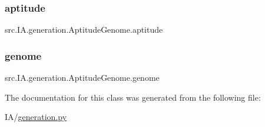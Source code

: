 \subsubsection{\texorpdfstring{aptitude}{aptitude}}
{\footnotesize\ttfamily src.\+I\+A.\+generation.\+Aptitude\+Genome.\+aptitude}

\mbox{\label{classsrc_1_1_i_a_1_1generation_1_1_aptitude_genome_adb2ea447f40cd23fa32ac81d0fa0749f}} 
\subsubsection{\texorpdfstring{genome}{genome}}
{\footnotesize\ttfamily src.\+I\+A.\+generation.\+Aptitude\+Genome.\+genome}



The documentation for this class was generated from the following file\+:\begin{DoxyCompactItemize}
\item 
I\+A/\hyperlink{generation_8py}{generation.\+py}\end{DoxyCompactItemize}
